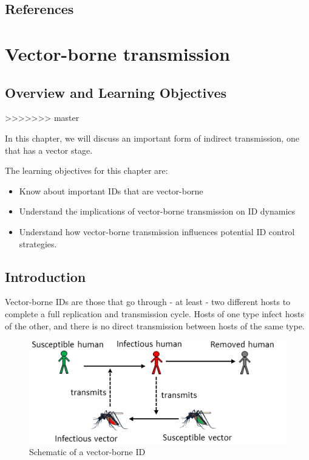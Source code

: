 \documentclass[]{book}
\providecommand{\tightlist}{%
  \setlength{\itemsep}{0pt}\setlength{\parskip}{0pt}}
\theoremstyle{definition}
\theoremstyle{definition}
\theoremstyle{definition}
\theoremstyle{remark}
\begin{document}
\section{References}\label{references-7}

\chapter{Vector-borne transmission}\label{vector-borne-transmission-1}

\section{Overview and Learning
Objectives}\label{overview-and-learning-objectives-7}
>>>>>>> master

In this chapter, we will discuss an important form of indirect
transmission, one that has a vector stage.

The learning objectives for this chapter are:

\begin{itemize}
\tightlist
\item
  Know about important IDs that are vector-borne
\item
  Understand the implications of vector-borne transmission on ID
  dynamics
\item
  Understand how vector-borne transmission influences potential ID
  control strategies.
\end{itemize}

\hypertarget{introduction-5}{%
\section{Introduction}\label{introduction-5}}

Vector-borne IDs are those that go through - at least - two different
hosts to complete a full replication and transmission cycle. Hosts of
one type infect hosts of the other, and there is no direct transmission
between hosts of the same type.

\begin{figure}
\centering
\includegraphics{./images/vectorborne-schematic.png}
\caption{Schematic of a vector-borne ID}
\end{figure}
\end{document}
